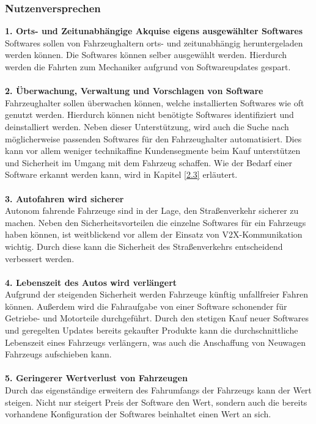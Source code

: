 \subsubsection{Nutzenversprechen} \label{nv}
\textbf{1. Orts- und Zeitunabhängige Akquise eigens ausgewählter Softwares}\\
Softwares sollen von Fahrzeughaltern orts- und zeitunabhängig heruntergeladen werden können. Die Softwares können selber ausgewählt werden. Hierdurch werden die Fahrten zum Mechaniker aufgrund von Softwareupdates gespart.\\\\
\textbf{2. Überwachung, Verwaltung und Vorschlagen von Software}\\
Fahrzeughalter sollen überwachen können, welche installierten Softwares wie oft genutzt werden. Hierdurch können nicht benötigte Softwares identifiziert und deinstalliert werden. Neben dieser Unterstützung, wird auch die Suche nach möglicherweise passenden Softwares für den Fahrzeughalter automatisiert. Dies kann vor allem weniger technikaffine Kundensegmente beim Kauf unterstützen und Sicherheit im Umgang mit dem Fahrzeug schaffen. Wie der Bedarf einer Software erkannt werden kann, wird in Kapitel \ref{2.3} erläutert.\\\\
\textbf{3. Autofahren wird sicherer}\\
Autonom fahrende Fahrzeuge sind in der Lage, den Straßenverkehr sicherer zu machen.\cite{b103} Neben den Sicherheitsvorteilen die einzelne Softwares für ein Fahrzeugs haben können, ist weitblickend vor allem der Einsatz von V2X-Kommunikation wichtig. Durch diese kann die Sicherheit des Straßenverkehrs entscheidend verbessert werden.\cite[S. 19]{vda}\\\\
\textbf{4. Lebenszeit des Autos wird verlängert}\\
Aufgrund der steigenden Sicherheit werden Fahrzeuge künftig unfallfreier Fahren können. Außerdem wird die Fahraufgabe von einer Software schonender für Getriebe- und Motorteile durchgeführt. Durch den stetigen Kauf neuer Softwares und geregelten Updates bereits gekaufter Produkte kann die durchschnittliche Lebenszeit eines Fahrzeugs verlängern, was auch die Anschaffung von Neuwagen Fahrzeugs aufschieben kann.\\\\
\textbf{5. Geringerer Wertverlust von Fahrzeugen}\\
Durch das eigenständige erweitern des Fahrumfangs der Fahrzeugs kann der Wert steigen. Nicht nur steigert Preis der Software den Wert, sondern auch die bereits vorhandene Konfiguration der Softwares beinhaltet einen Wert an sich.\\\\
